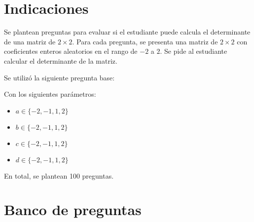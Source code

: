 \documentclass[a4,11pt]{aleph-notas}
\begin{document}
\encabezado

\vspace*{-8mm}
\section{Indicaciones}

Se plantean preguntas para evaluar si el estudiante puede calcula el determinante de una matriz de $2 \times 2$. Para cada pregunta, se presenta una matriz de $2 \times 2$ con coeficientes enteros aleatorios en el rango de $-2$ a $2$. Se pide al estudiante calcular el determinante de la matriz.



Se utilizó la siguiente pregunta base:


\noindent
Con los siguientes parámetros:
\begin{itemize}
	\item $a \in \{-2, -1, 1, 2\}$
	\item $b \in \{-2, -1, 1, 2\}$
	\item $c \in \{-2, -1, 1, 2\}$
	\item $d \in \{-2, -1, 1, 2\}$

\end{itemize}
En total, se plantean 100 preguntas.


\section{Banco de preguntas}
\end{document}
